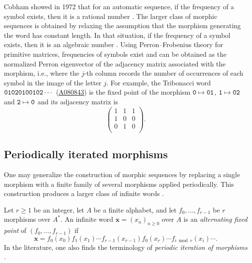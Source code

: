 \documentclass[12pt,reqno]{article}
\newcommand{\seqnum}[1]{\href{https://oeis.org/#1}{\rm \underline{#1}}}
\begin{document}
Cobham showed in 1972 that for an automatic sequence, if the frequency of a symbol exists, then it is a rational number \cite{Cobham1972}. 
The larger class of morphic sequences is obtained by relaxing the assumption that the morphism generating the word has constant length. In that situation, if the frequency of a symbol exists, then it is an algebraic number \cite[Thm.~8.4.5]{AS}. Using Perron--Frobenius theory for primitive matrices,  frequencies of symbols exist and can be obtained as the normalized Perron eigenvector of the adjacency matrix associated with the morphism,  i.e.,  where the $j$-th column records the number of occurrences of each symbol in the image of the letter $j$.
For example,  the Tribonacci word ${\tt 01020100102}\cdots$ (\seqnum{A080843}) is the fixed point of the morphism ${\tt 0}\mapsto {\tt 01}$, ${\tt 1}\mapsto {\tt 02}$ and ${\tt 2}\mapsto {\tt 0}$ and its adjacency matrix is
\[
  \begin{pmatrix}
    1&1&1\\
    1&0&0\\
    0&1&0\\
  \end{pmatrix}.
\]


\subsection{Periodically iterated morphisms}\label{ssec:per}
One may generalize the construction of morphic sequences by replacing a single morphism with a finite family of several morphisms applied periodically. This construction produces a larger class of infinite words \cite{Lepisto}.
\begin{definition}
\label{def: alternating fixed point}
Let $r\ge 1$ be an integer, let $A$ be a finite alphabet, and let $f_0,\ldots,f_{r-1}$ be $r$ morphisms over $A^*$. An infinite word $\mathbf{x}=(x_n)_{n\ge 0}$ over $A$ is an {\em alternating fixed point} of $(f_0,\ldots,f_{r-1})$ if 
$$\mathbf{x}=f_0(x_0)f_1(x_1)\cdots f_{r-1}(x_{r-1})f_0(x_r)\cdots f_{i\bmod{r}}(x_i)\cdots .$$
In the literature, one also finds the terminology of \emph{periodic iteration of morphisms} \cite{Endrullis,Lepisto}. 
\end{definition}
\end{document}
